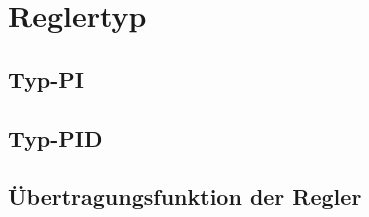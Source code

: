 \section{Reglertyp}
\subsection{Typ-PI}
\subsection{Typ-PID}
\subsection{Übertragungsfunktion der Regler}